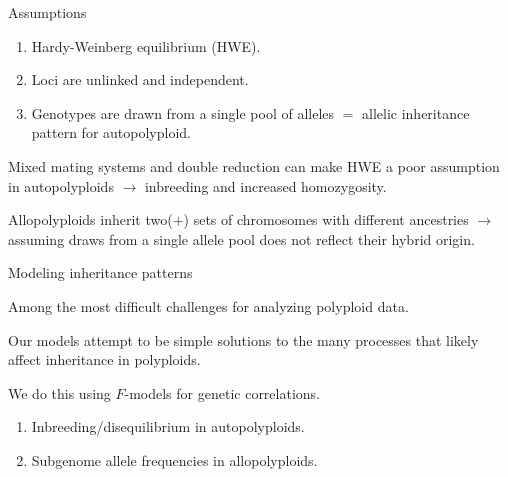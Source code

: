 \documentclass[presentation,sansserif]{beamer}
\begin{document}
\begin{frame}[t]{Assumptions}

  \begin{enumerate}
    \setlength\itemsep{0.25in}
    \item Hardy-Weinberg equilibrium (HWE).
    \item Loci are unlinked and independent.
    \item Genotypes are drawn from a single pool of alleles $=$ allelic inheritance pattern for autopolyploid.
  \end{enumerate}
  \vspace{0.25in}
  \pause

Mixed mating systems and double reduction can make HWE a poor assumption in autopolyploids \pause $\rightarrow$ inbreeding and increased homozygosity.
\vspace{0.25in}
\pause

Allopolyploids inherit two($+$) sets of chromosomes with different ancestries \pause $\rightarrow$ assuming draws from a single allele pool does not reflect their hybrid origin.

\end{frame}

\begin{frame}[t]{Modeling inheritance patterns}
\vspace{0.2in}
\pause

  Among the most difficult challenges for analyzing polyploid data.
  \vspace{0.3in}
  \pause
  
  Our models attempt to be simple solutions to the many processes that likely affect inheritance in polyploids.
  \vspace{0.3in}
  \pause
  
  We do this using $F$-models for genetic correlations.
  \vspace{0.3in}
  \pause
  
  	\begin{enumerate}
		\item Inbreeding/disequilibrium in autopolyploids.
		\item Subgenome allele frequencies in allopolyploids.
	\end{enumerate}

\end{frame}
\end{document}
